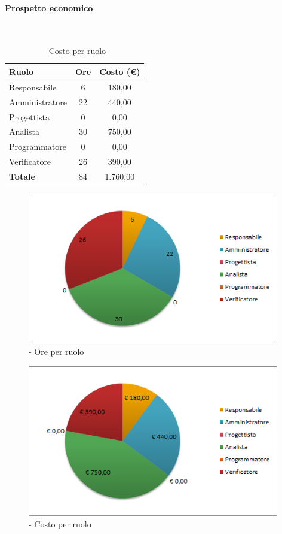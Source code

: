 \documentclass[./PianoDiProgetto.tex]{subfiles}
\begin{document}
\vspace{35 mm}	
	
	\paragraph{Prospetto economico}\
	
					\begin{table}[H]
		\centering
	
		\begin{tabular}{l * {2}{c}}
			\toprule
			\textbf{Ruolo} & \textbf{Ore} & \textbf{Costo (\euro{})} \\
			\midrule
			Responsabile &	6 & 180,00 \\
			Amministratore & 22 & 440,00 \\
			Progettista & 0 & 0,00 \\
			Analista & 30 & 750,00 \\
			Programmatore & 0 & 0,00 \\
			Verificatore & 26 & 390,00 \\
			\midrule		
			\textbf{Totale} & 84 & 1.760,00 \\
			\bottomrule 
		\end{tabular}
		\caption{\PerAD{} - Costo per ruolo}
	\end{table}
\vfill
\newpage
	
	\begin{figure}[H]
		\centering
		\includegraphics[width=11cm, trim=1cm 0cm 1cm 0cm]{grafici/AD-ruolo}
			\caption{\PerAD{} - Ore per ruolo}
	\end{figure}
\vfill
	\begin{figure}[H]
		\centering
		\includegraphics[width=11cm, trim=1cm 0cm 1cm 0cm]{grafici/AD-costo}
			\caption{\PerAD{} - Costo per ruolo}
	\end{figure}
\vfill		
\newpage	
\end{document}

